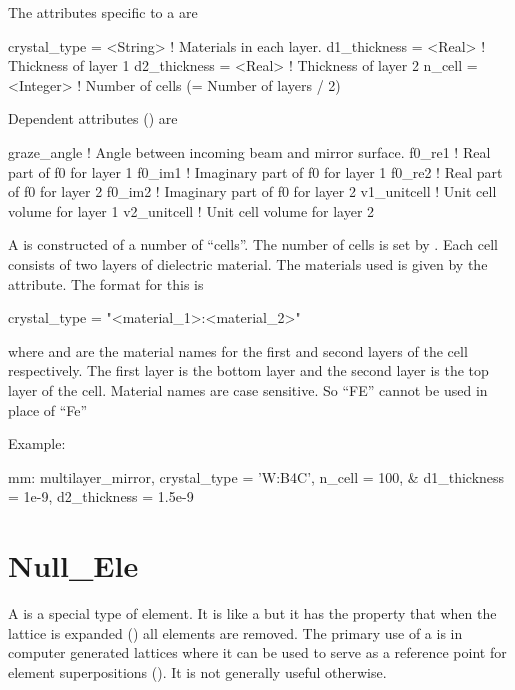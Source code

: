 {
The attributes specific to a  are 
\begin{example}
  crystal_type         = <String>  ! Materials in each layer.
  d1_thickness         = <Real>    ! Thickness of layer 1
  d2_thickness         = <Real>    ! Thickness of layer 2
  n_cell               = <Integer> ! Number of cells (= Number of layers / 2)
\end{example}

Dependent attributes () are
\begin{example}
  graze_angle      ! Angle between incoming beam and mirror surface.
  f0_re1           ! Real part of f0 for layer 1
  f0_im1           ! Imaginary part of f0 for layer 1
  f0_re2           ! Real part of f0 for layer 2
  f0_im2           ! Imaginary part of f0 for layer 2
  v1_unitcell      ! Unit cell volume for layer 1
  v2_unitcell      ! Unit cell volume for layer 2 
\end{example}

A  is constructed of a number of ``cells''. The
number of cells is set by . Each cell consists of two
layers of dielectric material. The materials used is given by
the  attribute. The format for this is
\begin{example}
  crystal_type = "<material_1>:<material_2>"
\end{example}
where  and  are the material names
for the first and second layers of the cell respectively. The first
layer is the bottom layer and the second layer is the top layer of the cell.
Material names are case sensitive. So ``FE'' cannot be used in place of ``Fe''

Example:
\begin{example}
  mm: multilayer_mirror, crystal_type = 'W:B4C', n_cell = 100, &
            d1_thickness = 1e-9, d2_thickness = 1.5e-9
\end{example}

\section{Null_Ele}
\label{s:null.ele}

A  is a special type of element. It is like a 
but it has the property that when the lattice is expanded
() all  elements are removed. The
primary use of a  is in computer generated lattices where
it can be used to serve as a reference point for element
superpositions (). It is not generally useful otherwise.

}
